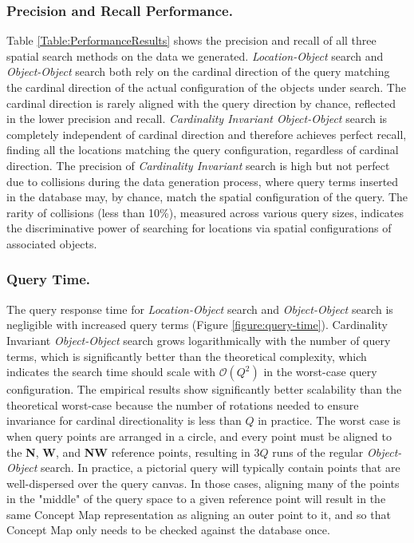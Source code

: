 \subsubsection{Precision and Recall Performance.} 
Table \ref{Table:PerformanceResults} shows the precision and recall of all three spatial search methods on the data we generated.
\textit{Location-Object} search and \textit{Object-Object} search both rely on the cardinal direction of the query matching the cardinal direction of the actual configuration of the objects under search.
The cardinal direction is rarely aligned with the query direction by chance, reflected in the lower precision and recall.
\textit{Cardinality Invariant Object-Object} search is completely independent of cardinal direction and therefore achieves perfect recall, finding all the locations matching the query configuration, regardless of cardinal direction.
The precision of \textit{Cardinality Invariant} search is high but not perfect due to collisions during the data generation process, where query terms inserted in the database may, by chance, match the spatial configuration of the query.
The rarity of collisions (less than 10\%), measured across various query sizes, indicates the discriminative power of searching for locations via spatial configurations of associated objects.

\subsubsection{Query Time.}
The query response time for \textit{Location-Object} search and \textit{Object-Object} search is negligible with increased query terms (Figure \ref{figure:query-time}).
Cardinality Invariant \textit{Object-Object} search grows logarithmically with the number of query terms, which is significantly better than the theoretical complexity, which indicates the search time should scale with $\mathcal{O}(Q^2)$ in the worst-case query configuration.
The empirical results show significantly better scalability than the theoretical worst-case because the number of rotations needed to ensure invariance for cardinal directionality is less than $Q$ in practice. 
The worst case is when query points are arranged in a circle, and every point must be aligned to the \textbf{N}, \textbf{W}, and \textbf{NW} reference points, resulting in $3Q$ runs of the regular \textit{Object-Object} search.
In practice, a pictorial query will typically contain points that are well-dispersed over the query canvas.
In those cases, aligning many of the points in the "middle" of the query space to a given reference point will result in the same Concept Map representation as aligning an outer point to it, and so that Concept Map only needs to be checked against the database once.


